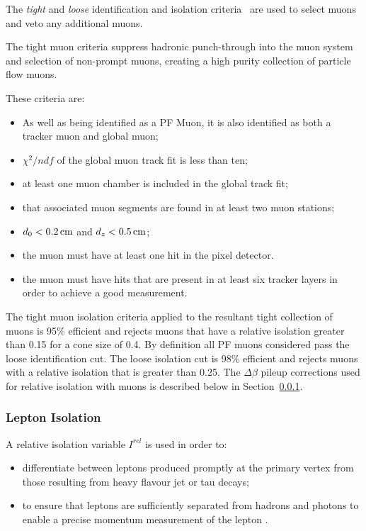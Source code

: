 The \emph{tight} and \emph{loose} identification and isolation criteria~\cite{Chatrchyan:2012xi} are used to select muons and veto any additional muons.

The tight muon criteria suppress hadronic punch-through into the muon system and selection of non-prompt muons, creating a high purity collection of particle flow muons.

These criteria are:
\begin{itemize}
\item As well as being identified as a PF Muon, it is also identified as both a tracker muon and global muon;
\item $\chi^{2}/ndf$ of the global muon track fit is less than ten;
\item at least one muon chamber is included in the global track fit;
\item that associated muon segments are found in at least two muon stations;
\item $d_{0} < 0.2\,\text{cm}$ and $d_{z} < 0.5\,\text{cm}$;
\item the muon must have at least one hit in the pixel detector.
\item the muon must have hits that are present in at least six tracker layers in order to achieve a good \pT measurement.
\end{itemize}

The tight muon isolation criteria applied to the resultant tight collection of muons is 95\% efficient and rejects muons that have a relative isolation greater than 0.15 for a cone size of 0.4.
By definition all PF muons considered pass the loose identification cut.
The loose isolation cut is 98\% efficient and rejects muons with a relative isolation that is greater than 0.25.
The $\Delta\beta$ pileup corrections used for relative isolation with muons is described below in Section~\ref{subsubsec:relIso}.

\subsubsection{Lepton Isolation}\label{subsubsec:relIso}
A relative isolation variable $I^{rel}$ is used in order to:
\begin{itemize}
\item differentiate between leptons produced promptly at the primary vertex from those resulting from heavy flavour jet or tau decays;
\item to ensure that leptons are sufficiently separated from hadrons and photons to enable a precise momentum measurement of the lepton .
\end{itemize}

